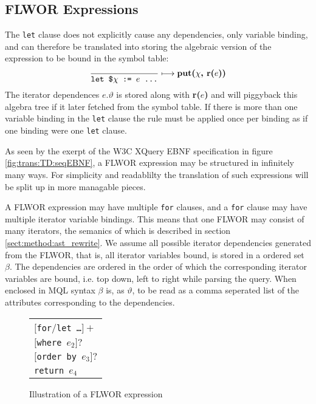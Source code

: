 \subsection{FLWOR Expressions}
\label{sect:trans:TD:simpleFLWOR}
The \texttt{let} clause does not explicitly cause any dependencies, only variable binding, and can therefore be
translated into storing the algebraic version of the expression to be bound in the symbol table:
\begin{equation}
\frac{}{\mbox{\texttt{let \$}}\chi \mbox{\texttt{ := }}e \mbox{\texttt{ \ldots}}}\longmapsto
\mbox{\textbf{put(}}\chi\mbox{\textbf{, r(}}e\mbox{\textbf{))}}
\label{rule:trans:TD:letbind}
\end{equation}
The iterator dependences $e.\vartheta$ is stored along with \textbf{r(}$e$\textbf{)} and will piggyback this
algebra tree if it later fetched from the symbol table. If there is more than one variable binding in the
\texttt{let} clause the rule must be applied once per binding as if one binding were one \texttt{let} clause.

As seen by the exerpt of the W3C XQuery EBNF specification in figure \ref{fig:trans:TD:seqEBNF}, a FLWOR
expression may be structured in infinitely many ways. For simplicity and readablilty the translation of such
expressions will be split up in more managable pieces. 

A FLWOR expression may have multiple \texttt{for} clauses, and a \texttt{for} clause may have multiple iterator
variable bindings. This means that one FLWOR may consist of many iterators, the semanics of which is described in
section \ref{sect:method:ast_rewrite}. We assume all possible iterator dependencies generated from the FLWOR, that
is, all iterator variables bound, is stored in a ordered set $\beta$. The dependencies are ordered in the order of
which the corresponding iterator variables are bound, i.e. top down, left to right while parsing the query. When
enclosed in MQL syntax $\beta$ is, as $\vartheta$, to be read as a comma seperated list of the attributes
corresponding to the dependencies.

\begin{figure}[h]
\centering
\begin{tabular}{l}
$[$\texttt{for}/\texttt{let \ldots}$]+$ \\ \quad
$[$\texttt{where }$e_2]?$ \\ \quad
$[$\texttt{order by }$e_3]?$ \\
\texttt{return }$e_4$
\end{tabular}
\label{fig:trans:TD:flworIll}
\caption{Illustration of a FLWOR expression}
\end{figure}

